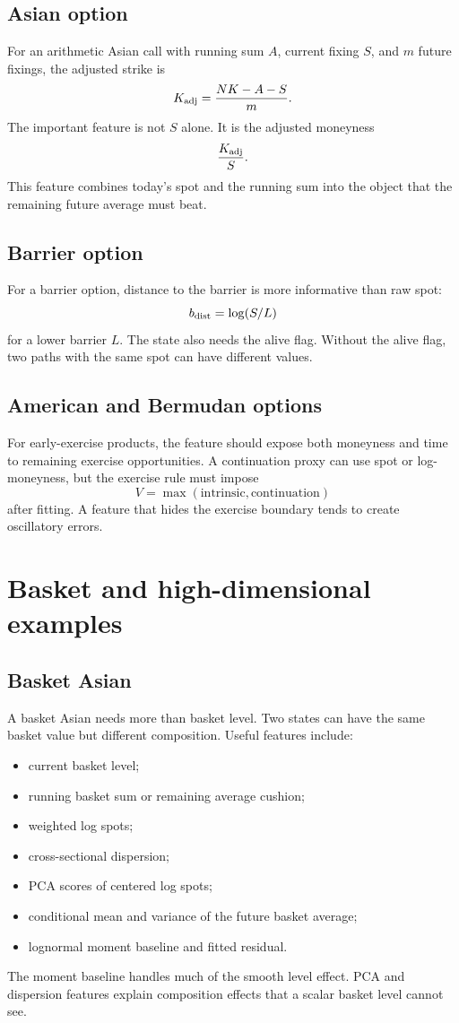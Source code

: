 \documentclass[11pt,oneside]{book}
\theoremstyle{definition}
\begin{document}
\subsection{Asian option}
For an arithmetic Asian call with running sum \(A\), current fixing \(S\), and
\(m\) future fixings, the adjusted strike is
\[
  K_{\rm adj}=\frac{NK-A-S}{m}.
\]
The important feature is not \(S\) alone. It is the adjusted moneyness
\[
  \frac{K_{\rm adj}}{S}.
\]
This feature combines today's spot and the running sum into the object that
the remaining future average must beat.

\subsection{Barrier option}
For a barrier option, distance to the barrier is more informative than raw
spot:
\[
  b_{\rm dist}=\log(S/L)
\]
for a lower barrier \(L\). The state also needs the alive flag. Without the
alive flag, two paths with the same spot can have different values.

\subsection{American and Bermudan options}
For early-exercise products, the feature should expose both moneyness and time
to remaining exercise opportunities. A continuation proxy can use spot or
log-moneyness, but the exercise rule must impose
\[
  V=\max(\text{intrinsic},\text{continuation})
\]
after fitting. A feature that hides the exercise boundary tends to create
oscillatory errors.

\section{Basket and high-dimensional examples}
\subsection{Basket Asian}
A basket Asian needs more than basket level. Two states can have the same
basket value but different composition. Useful features include:
\begin{itemize}
  \item current basket level;
  \item running basket sum or remaining average cushion;
  \item weighted log spots;
  \item cross-sectional dispersion;
  \item PCA scores of centered log spots;
  \item conditional mean and variance of the future basket average;
  \item lognormal moment baseline and fitted residual.
\end{itemize}
The moment baseline handles much of the smooth level effect. PCA and
dispersion features explain composition effects that a scalar basket level
cannot see.
\end{document}
